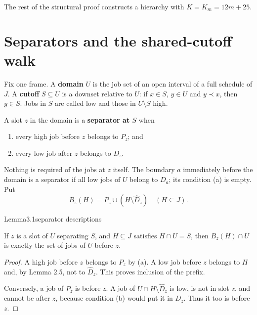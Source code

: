 The rest of the structural proof constructs a hierarchy with \(K=K_m=12m+25\).

\section{Separators and the shared-cutoff walk}

Fix one frame. A \textbf{domain} \(U\) is the job set of an open interval of a full schedule of \(J\). A \textbf{cutoff} \(S\subseteq U\) is a downset relative to \(U\): if \(x\in S\), \(y\in U\) and \(y\prec x\), then \(y\in S\). Jobs in \(S\) are called low and those in \(U\setminus S\) high.

A slot \(z\) in the domain is a \textbf{separator at \(S\)} when

\begin{enumerate}
\def\labelenumi{(\alph{enumi})}
\item
  every high job before \(z\) belongs to \(P_z\); and
\item
  every low job after \(z\) belongs to \(D_z\).
\end{enumerate}

Nothing is required of the jobs at \(z\) itself. The boundary \(a\) immediately before the domain is a separator if all low jobs of \(U\) belong to \(D_a\); its condition (a) is empty. Put \[
B_z(H)=P_z\cup(H\setminus\widehat D_z)
\quad(H\subseteq J).
\tag{3.1}
\]

\begin{numbered}{Lemma}{3.1}{separator descriptions}

If \(z\) is a slot of \(U\) separating \(S\), and \(H\subseteq J\) satisfies \(H\cap U=S\), then \(B_z(H)\cap U\) is exactly the set of jobs of \(U\) before \(z\).

\end{numbered}

\begin{proof}
A high job before \(z\) belongs to \(P_z\) by (a). A low job before \(z\) belongs to \(H\) and, by Lemma 2.5, not to \(\widehat D_z\). This proves inclusion of the prefix.

Conversely, a job of \(P_z\) is before \(z\). A job of \(U\cap H\setminus\widehat D_z\) is low, is not in slot \(z\), and cannot be after \(z\), because condition (b) would put it in \(D_z\). Thus it too is before \(z\).
\end{proof}

